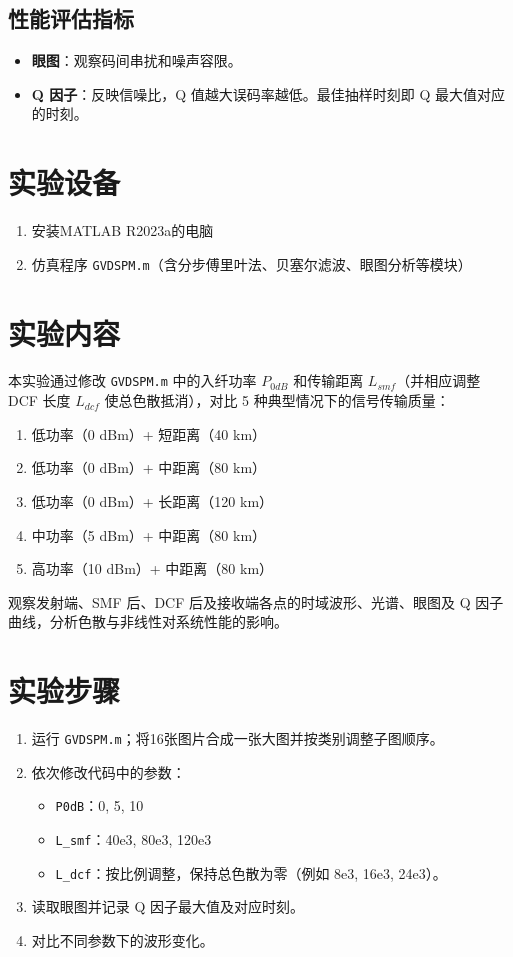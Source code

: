 \documentclass{../ElectromagneticFieldTemplate}
\begin{document}
\subsection{性能评估指标}
\begin{itemize}
    \item \textbf{眼图}：观察码间串扰和噪声容限。
    \item \textbf{Q 因子}：反映信噪比，Q 值越大误码率越低。最佳抽样时刻即 Q 最大值对应的时刻。
\end{itemize}

\section{实验设备}

\begin{enumerate}
    \item 安装MATLAB R2023a的电脑
    \item 仿真程序 \texttt{GVDSPM.m}（含分步傅里叶法、贝塞尔滤波、眼图分析等模块）
\end{enumerate}

\section{实验内容}

本实验通过修改 \texttt{GVDSPM.m} 中的入纤功率 \(P_{0dB}\) 和传输距离 \(L_{smf}\)（并相应调整 DCF 长度 \(L_{dcf}\) 使总色散抵消），对比 5 种典型情况下的信号传输质量：
\begin{enumerate}
    \item 低功率（0 dBm）+ 短距离（40 km）
    \item 低功率（0 dBm）+ 中距离（80 km）
    \item 低功率（0 dBm）+ 长距离（120 km）
    \item 中功率（5 dBm）+ 中距离（80 km）
    \item 高功率（10 dBm）+ 中距离（80 km）
\end{enumerate}
观察发射端、SMF 后、DCF 后及接收端各点的时域波形、光谱、眼图及 Q 因子曲线，分析色散与非线性对系统性能的影响。

\section{实验步骤}

\begin{enumerate}
    \item 运行 \texttt{GVDSPM.m}；将16张图片合成一张大图并按类别调整子图顺序。
    \item 依次修改代码中的参数：
    \begin{itemize}
        \item \texttt{P0dB}：0, 5, 10
        \item \texttt{L\_smf}：40e3, 80e3, 120e3
        \item \texttt{L\_dcf}：按比例调整，保持总色散为零（例如 8e3, 16e3, 24e3）。
    \end{itemize}
    \item 读取眼图并记录 Q 因子最大值及对应时刻。
    \item 对比不同参数下的波形变化。
\end{enumerate}
\end{document}
